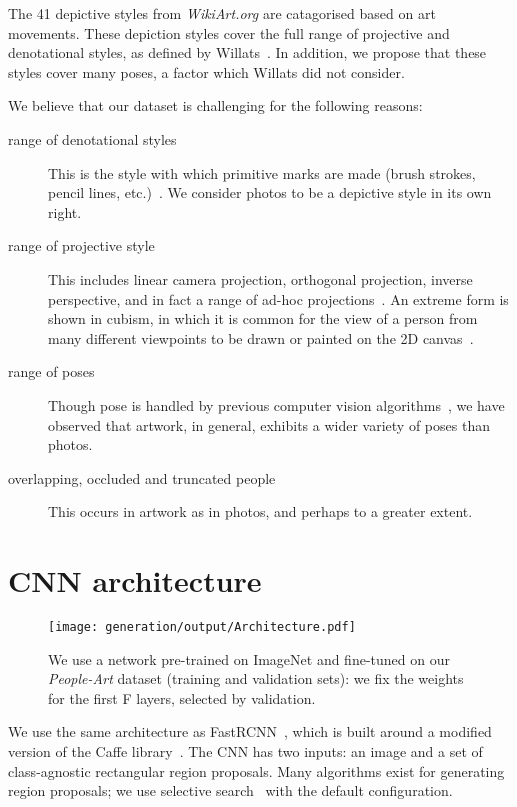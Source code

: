 \documentclass[runningheads]{llncs}
\begin{document}
The 41 depictive styles from \textit{WikiArt.org} are catagorised based on art movements.
These depiction styles cover the full range of projective and denotational styles, as defined by Willats~\cite{willats1997art}.
In addition, we propose that these styles cover many poses, a factor which Willats did not consider.

We believe that our dataset is challenging for the following reasons:
\begin{description}
\item[range of denotational styles] This is the style with which primitive marks are made (brush strokes, pencil lines, etc.)~\cite{willats1997art}.
We consider \acp{photo} to be a depictive style in its own right.
\item[range of projective style] This includes linear camera projection, orthogonal projection, inverse perspective, and in fact a range of ad-hoc projections~\cite{willats1997art}. An extreme form is shown in cubism, in which it is common for the view of a person from many different viewpoints to be drawn or painted on the 2D canvas~\cite{ginosar2014detecting}.
\item[range of poses] Though pose is handled by previous computer vision algorithms~\cite{felzenszwalb2010object}, we have observed that \ac{artwork}, in general, exhibits a wider variety of poses than \acp{photo}.
\item[overlapping, occluded and truncated people] This occurs in \ac{artwork} as in \acp{photo}, and perhaps to a greater extent.
\end{description}
 
\section{\ac{CNN} architecture}
\label{sec:CNNarchitecture}
\begin{figure}[b!]
  \centering
  \texttt{[image: generation/output/Architecture.pdf]}
  \caption{We use a network pre-trained on ImageNet and fine-tuned on our \textit{People-Art} dataset (training and validation sets): we fix the weights for the first F layers, selected by validation.\label{fig:networkArchitecture}}
\end{figure}

We use the same architecture as \ac{FastRCNN}~\cite{girshick2015fast}, which is built around a modified version of the Caffe library~\cite{jia2014caffe}.
The \ac{CNN} has two inputs: an image and a set of class-agnostic rectangular region proposals.
Many algorithms exist for generating region proposals; we use selective search~\cite{uijlings2013selective} with the default configuration.
\label{sec:architectureSelSearch}
\end{document}
